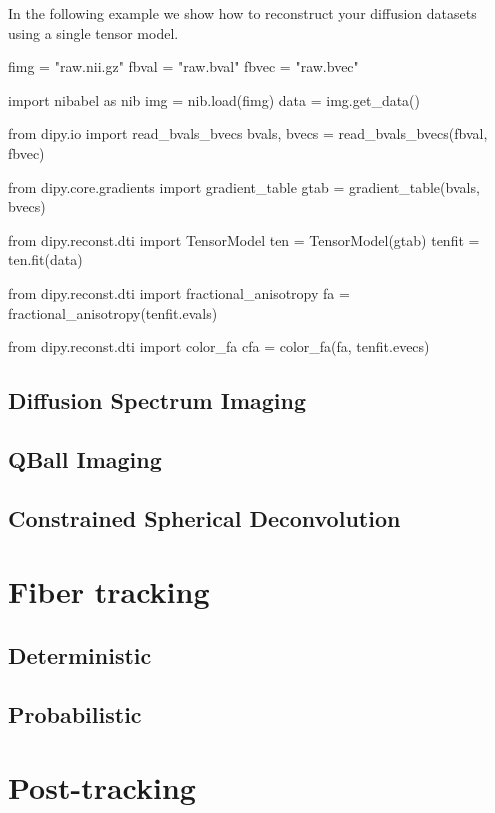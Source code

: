 \documentclass{bioinfo}
\begin{document}
In the following example we show how to reconstruct your diffusion datasets
using a single tensor model.

\begin{python}
fimg = "raw.nii.gz"
fbval = "raw.bval"
fbvec = "raw.bvec"

import nibabel as nib
img = nib.load(fimg)
data = img.get_data()

from dipy.io import read_bvals_bvecs
bvals, bvecs = read_bvals_bvecs(fbval, fbvec)

from dipy.core.gradients import gradient_table
gtab = gradient_table(bvals, bvecs)

from dipy.reconst.dti import TensorModel
ten = TensorModel(gtab)
tenfit = ten.fit(data)

from dipy.reconst.dti import fractional_anisotropy
fa = fractional_anisotropy(tenfit.evals)

from dipy.reconst.dti import color_fa
cfa = color_fa(fa, tenfit.evecs)
\end{python}

\subsection{Diffusion Spectrum Imaging}

\subsection{QBall Imaging}

\subsection{Constrained Spherical Deconvolution} 

\section{Fiber tracking}

\subsection{Deterministic}

\subsection{Probabilistic}

\section{Post-tracking}
\end{document}
